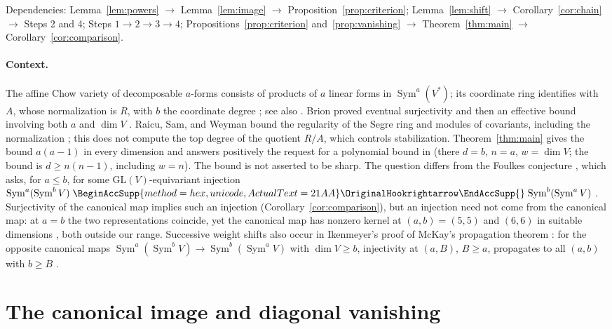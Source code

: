 \documentclass[11pt]{article}
\renewcommand{\hookrightarrow}{\mathrel{
  \BeginAccSupp{method=hex,unicode,ActualText=21AA}
  \OriginalHookrightarrow\EndAccSupp{}}}
\theoremstyle{remark}
\DeclareMathOperator{\Sym}{Sym}
\begin{document}
Dependencies: Lemma~\ref{lem:powers} $\to$ Lemma~\ref{lem:image} $\to$
Proposition~\ref{prop:criterion}; Lemma~\ref{lem:shift} $\to$
Corollary~\ref{cor:chain} $\to$ Steps 2 and 4; Steps
$1\to2\to3\to4$; Propositions~\ref{prop:criterion} and~\ref{prop:vanishing}
$\to$ Theorem~\ref{thm:main} $\to$ Corollary~\ref{cor:comparison}.

\paragraph{Context.}
The affine Chow variety of decomposable $a$-forms consists of products of $a$
linear forms in $\Sym^a(V^*)$; its coordinate ring identifies with $A$, whose
normalization is $R$, with $b$ the coordinate degree
\cite[Section~2, Theorem~2.3]{RSW}; see also
\cite[Section~7.6, Propositions~7.11--7.12]{Landsberg}. Brion proved eventual
surjectivity \cite{Brion1993} and then an effective bound involving both $a$
and $\dim V$ \cite[Theorem~3.3]{Brion}. Raicu, Sam, and Weyman bound the
regularity of the Segre ring and modules of covariants, including the
normalization \cite[Theorem~3.9]{RSW}; this does not compute the top degree
of the quotient $R/A$, which controls stabilization.
Theorem~\ref{thm:main} gives the bound $a(a-1)$ in every dimension and
answers positively the request for a polynomial bound in
\cite[Problem~7.19]{Landsberg} (there $d=b$, $n=a$, $w=\dim V$; the bound is
$d\ge n(n-1)$, including $w=n$). The bound is not asserted to be sharp.
The question differs from the Foulkes conjecture \cite{Foulkes1950}, which
asks, for $a\le b$, for some $\mathrm{GL}(V)$-equivariant injection
$\Sym^a(\Sym^bV)\hookrightarrow\Sym^b(\Sym^aV)$
\cite[Conjecture~2.10]{RSW}. Surjectivity of the canonical map implies such
an injection (Corollary~\ref{cor:comparison}), but an injection need not come
from the canonical map: at $a=b$ the two representations coincide, yet the
canonical map has nonzero kernel at $(a,b)=(5,5)$ and $(6,6)$ in suitable
dimensions \cite[arXiv version, Theorem~6(b),(c) and Remark~7]{CIM}, both
outside our range. Successive weight shifts also occur in Ikenmeyer's proof
\cite[Section~5]{Ikenmeyer} of McKay's propagation theorem \cite{McKay}:
for the opposite canonical maps $\Sym^a(\Sym^bV)\to\Sym^b(\Sym^aV)$ with
$\dim V\ge b$, injectivity at $(a,B)$, $B\ge a$, propagates to all $(a,b)$
with $b\ge B$ \cite[Theorem~1.3 and Section~3]{Ikenmeyer}.

\section{The canonical image and diagonal vanishing}\label{sec:map}
\end{document}
